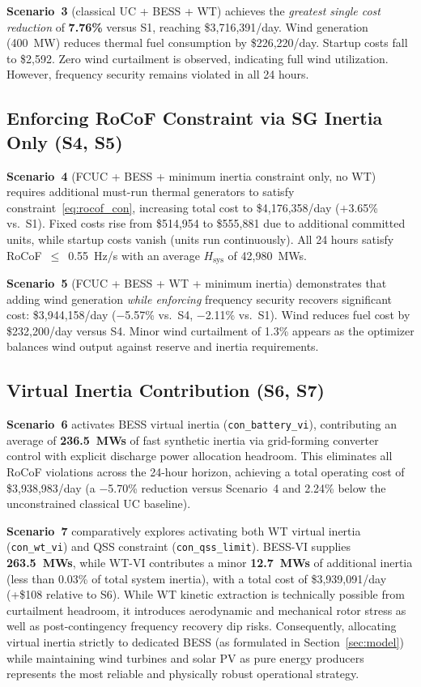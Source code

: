 \documentclass[journal]{IEEEtran}
\begin{document}
\textbf{Scenario~3} (classical UC + BESS + WT) achieves the
\emph{greatest single cost reduction} of \textbf{7.76\%}
versus S1, reaching \$3{,}716{,}391/day. Wind generation
(400~MW) reduces thermal fuel consumption by \$226{,}220/day.
Startup costs fall to \$2{,}592. Zero wind curtailment is
observed, indicating full wind utilization. However,
frequency security remains violated in all 24 hours.

\subsection{Enforcing RoCoF Constraint via SG Inertia Only (S4, S5)}

\textbf{Scenario~4} (FCUC + BESS + minimum inertia constraint only,
no WT) requires additional must-run thermal generators to satisfy
constraint~\eqref{eq:rocof_con}, increasing total cost to
\$4{,}176{,}358/day ($+$3.65\% vs.\ S1).
Fixed costs rise from \$514{,}954 to \$555{,}881 due to
additional committed units, while startup costs vanish (units
run continuously).
All 24 hours satisfy RoCoF~$\leq$~0.55~Hz/s with an
average $H_{\text{sys}}$ of 42{,}980~MWs.

\textbf{Scenario~5} (FCUC + BESS + WT + minimum inertia) demonstrates
that adding wind generation \emph{while enforcing} frequency security
recovers significant cost: \$3{,}944{,}158/day ($-$5.57\% vs.\ S4,
$-$2.11\% vs.\ S1). Wind reduces fuel cost by \$232{,}200/day
versus S4. Minor wind curtailment of 1.3\% appears as the optimizer
balances wind output against reserve and inertia requirements.

\subsection{Virtual Inertia Contribution (S6, S7)}

\textbf{Scenario~6} activates BESS virtual inertia
(\texttt{con\_battery\_vi}), contributing an average of
\textbf{236.5~MWs} of fast synthetic inertia via grid-forming converter
control with explicit discharge power allocation headroom.
This eliminates all RoCoF violations across the 24-hour horizon,
achieving a total operating cost of \$3{,}938{,}983/day (a $-$5.70\%
reduction versus Scenario~4 and 2.24\% below the unconstrained
classical UC baseline).

\textbf{Scenario~7} comparatively explores activating both WT
virtual inertia (\texttt{con\_wt\_vi}) and QSS constraint
(\texttt{con\_qss\_limit}). BESS-VI supplies \textbf{263.5~MWs},
while WT-VI contributes a minor \textbf{12.7~MWs} of additional inertia
(less than 0.03\% of total system inertia), with a total cost of
\$3{,}939{,}091/day (+\$108 relative to S6).
While WT kinetic extraction is technically possible from curtailment headroom,
it introduces aerodynamic and mechanical rotor stress as well as post-contingency
frequency recovery dip risks. Consequently, allocating virtual inertia
strictly to dedicated BESS (as formulated in Section~\ref{sec:model})
while maintaining wind turbines and solar PV as pure energy producers
represents the most reliable and physically robust operational strategy.
\end{document}
